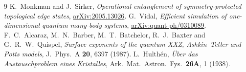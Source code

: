 \documentclass[11pt,a4paper]{article}
\begin{document}

\begin{thebibliography}{9}
K.~Monkman and J.~Sirker, \emph{Operational entanglement of symmetry-protected topological edge states}, \href{https://arxiv.org/abs/2005.13026}{arXiv:2005.13026}.
G.~Vidal, \emph{Efficient simulation of one-dimensional quantum many-body systems}, \href{https://arxiv.org/abs/quant-ph/0310089}{arXiv:quant-ph/0310089}.
F.~C.~Alcaraz, M.~N.~Barber, M.~T.~Batchelor, R.~J.~Baxter and G.~R.~W.~Quispel, \emph{Surface exponents of the quantum XXZ, Ashkin--Teller and Potts models}, J.~Phys.~A \textbf{20}, 6397 (1987).
L.~Hulth\'en, \emph{\"Uber das Austauschproblem eines Kristalles}, Ark.~Mat.~Astron.~Fys.~\textbf{26A}, 1 (1938).
\end{thebibliography}
\end{document}
